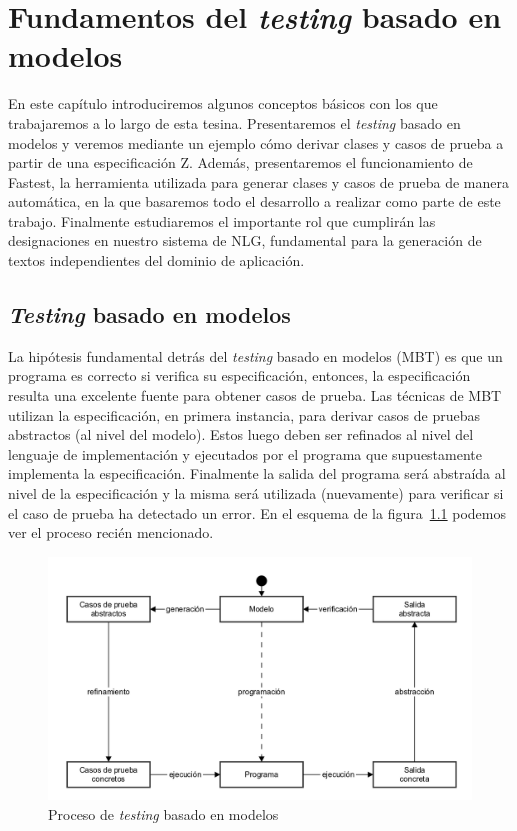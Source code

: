 \chapter[\textit{Testing} Basado en Modelos]{Fundamentos del \textit{testing} basado en modelos}
\label{cap:fundamentos}

En este capítulo introduciremos algunos conceptos básicos con los que trabajaremos a lo largo de esta tesina. Presentaremos el \textit{testing} basado en modelos y veremos mediante un ejemplo cómo derivar clases y casos de prueba a partir de una especificación Z. Además, presentaremos el funcionamiento de Fastest, la herramienta utilizada para generar clases y casos de prueba de manera automática, en la que basaremos todo el desarrollo a realizar como parte de este trabajo. Finalmente estudiaremos el importante rol que cumplirán las designaciones en nuestro sistema de NLG, fundamental para la generación de textos independientes del dominio de aplicación.

\section{\textit{Testing} basado en modelos}

La hipótesis fundamental detrás del \textit{testing} basado en modelos (MBT) es que un programa es correcto si verifica su especificación, entonces, la especificación resulta una excelente fuente para obtener casos de prueba. Las técnicas de MBT utilizan la especificación, en primera instancia, para derivar casos de pruebas abstractos (al nivel del modelo). Estos luego deben ser refinados al nivel del lenguaje de implementación y ejecutados por el programa que supuestamente implementa la especificación. Finalmente la salida del programa será abstraída al nivel de la especificación y la misma será utilizada (nuevamente) para verificar si el caso de prueba ha detectado un error. En el esquema de la figura~\ref{fig:proc_mbt} podemos ver el proceso recién mencionado.

\begin{figure}[H]
\begin{center}
\includegraphics[scale=0.25]{img/proc_mbt.png}
\caption{Proceso de \textit{testing} basado en modelos}
\label{fig:proc_mbt}
\end{center}
\end{figure}


